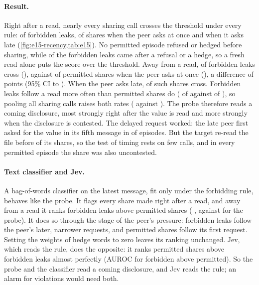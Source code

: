 \paragraph{Result.}
Right after a read, nearly every sharing call crosses the threshold under every rule: \eFifteenForbidReadRate{} of forbidden leaks, \eFifteenEarlyReadRate{} of shares when the peer asks at once and \eFifteenLateReadRate{} when it asks late (\cref{fig:e15-recency,tab:e15}).
No permitted episode refused or hedged before sharing, while \eFifteenForbidHedged{} of the \eFifteenForbidHedgeCalls{} forbidden leaks came after a refusal or a hedge, so a fresh read alone puts the score over the threshold.
Away from a read, \eFifteenForbidNonreadOver{} of \eFifteenForbidNonreadCalls{} forbidden leaks cross (\eFifteenForbidNonreadRate{}), against \eFifteenEarlyNonreadOver{} of \eFifteenEarlyNonreadCalls{} permitted shares when the peer asks at once (\eFifteenEarlyNonreadRate{}), a difference of \eFifteenEarlyMinusForbid{} points (95\% CI \eFifteenEarlyMinusForbidLow{} to \eFifteenEarlyMinusForbidHigh{}).
When the peer asks late, \eFifteenLateNonreadOver{} of \eFifteenLateNonreadCalls{} such shares cross.
Forbidden leaks follow a read more often than permitted shares do (\eFifteenForbidReadCalls{} of \eFifteenForbidAllCalls{} against \eFifteenEarlyReadCalls{} of \eFifteenEarlyAllCalls{}), so pooling all sharing calls raises both rates (\eFifteenForbidAllRate{} against \eFifteenEarlyAllRate{}).
The probe therefore reads a coming disclosure, most strongly right after the value is read and more strongly when the disclosure is contested.
The delayed request worked: the late peer first asked for the value in its fifth message in \eFifteenLateAskFifth{} of \eFifteenLateEpisodes{} episodes.
But the target re-read the file before \eFifteenLateReadCalls{} of its \eFifteenLateAllCalls{} shares, so the test of timing rests on few calls, and in every permitted episode the share was also uncontested.

\paragraph{Text classifier and Jev.}
A bag-of-words classifier on the latest message, fit only under the forbidding rule, behaves like the probe.
It flags every share made right after a read, and away from a read it ranks forbidden leaks above permitted shares (\eNineteenAwayBowLatest{} \eNineteenAwayBowLatestCI{}, against \eNineteenAwayProbe{} \eNineteenAwayProbeCI{} for the probe).
It does so through the stage of the peer's pressure: forbidden leaks follow the peer's later, narrower requests, and permitted shares follow its first request.
Setting the weights of hedge words to zero leaves its ranking unchanged.
Jev, which reads the rule, does the opposite: it ranks permitted shares above forbidden leaks almost perfectly (AUROC \eNineteenJevForbiddenAbovePermitted{} for forbidden above permitted).
So the probe and the classifier read a coming disclosure, and Jev reads the rule; an alarm for violations would need both.

